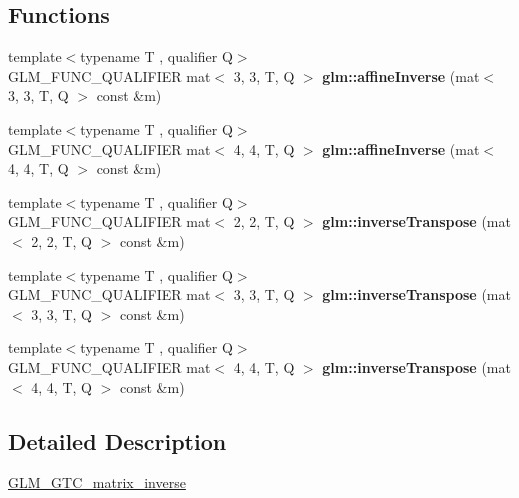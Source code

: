 \subsection*{Functions}
\begin{DoxyCompactItemize}
\item 
\mbox{\label{matrix__inverse_8inl_ab06878a5dc78d95a856e4d91fcbc8e8e}} 
{\footnotesize template$<$typename T , qualifier Q$>$ }\\G\+L\+M\+\_\+\+F\+U\+N\+C\+\_\+\+Q\+U\+A\+L\+I\+F\+I\+ER mat$<$ 3, 3, T, Q $>$ {\bfseries glm\+::affine\+Inverse} (mat$<$ 3, 3, T, Q $>$ const \&m)
\item 
\mbox{\label{matrix__inverse_8inl_a9dcf422db11feb085e18abca92d8f3e3}} 
{\footnotesize template$<$typename T , qualifier Q$>$ }\\G\+L\+M\+\_\+\+F\+U\+N\+C\+\_\+\+Q\+U\+A\+L\+I\+F\+I\+ER mat$<$ 4, 4, T, Q $>$ {\bfseries glm\+::affine\+Inverse} (mat$<$ 4, 4, T, Q $>$ const \&m)
\item 
\mbox{\label{matrix__inverse_8inl_a616278b85e66d08597d9d24eedf27258}} 
{\footnotesize template$<$typename T , qualifier Q$>$ }\\G\+L\+M\+\_\+\+F\+U\+N\+C\+\_\+\+Q\+U\+A\+L\+I\+F\+I\+ER mat$<$ 2, 2, T, Q $>$ {\bfseries glm\+::inverse\+Transpose} (mat$<$ 2, 2, T, Q $>$ const \&m)
\item 
\mbox{\label{matrix__inverse_8inl_a5c1e146d84cfb99e35cfbaf69ecd37a5}} 
{\footnotesize template$<$typename T , qualifier Q$>$ }\\G\+L\+M\+\_\+\+F\+U\+N\+C\+\_\+\+Q\+U\+A\+L\+I\+F\+I\+ER mat$<$ 3, 3, T, Q $>$ {\bfseries glm\+::inverse\+Transpose} (mat$<$ 3, 3, T, Q $>$ const \&m)
\item 
\mbox{\label{matrix__inverse_8inl_a54ac106dd048ffce709a48b2ec2b9052}} 
{\footnotesize template$<$typename T , qualifier Q$>$ }\\G\+L\+M\+\_\+\+F\+U\+N\+C\+\_\+\+Q\+U\+A\+L\+I\+F\+I\+ER mat$<$ 4, 4, T, Q $>$ {\bfseries glm\+::inverse\+Transpose} (mat$<$ 4, 4, T, Q $>$ const \&m)
\end{DoxyCompactItemize}


\subsection{Detailed Description}
\hyperlink{group__gtc__matrix__inverse}{G\+L\+M\+\_\+\+G\+T\+C\+\_\+matrix\+\_\+inverse} 